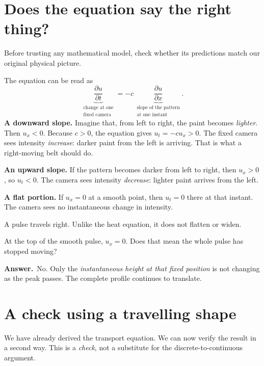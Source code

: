 \documentclass[11pt,a4paper]{article}
\newcommand{\secstart}[1]{\Needspace{7\baselineskip}\section{#1}}
\newcommand{\answer}{\par\smallskip\textbf{Answer.}~}
\newcommand{\captionline}[1]{\begin{center}\small\color{muted}#1\end{center}}
\begin{document}
\clearpage
\secstart{Does the equation say the right thing?}
Before trusting any mathematical model, check whether its predictions match our original physical picture.

The equation can be read as
\[
\underbrace{\frac{\partial u}{\partial t}}_{\substack{\text{change at one}\\\text{fixed camera}}}
=-c\,\underbrace{\frac{\partial u}{\partial x}}_{\substack{\text{slope of the pattern}\\\text{at one instant}}}.
\]
\textbf{A downward slope.} Imagine that, from left to right, the paint becomes \emph{lighter}. Then $u_x<0$. Because $c>0$, the equation gives $u_t=-cu_x>0$. The fixed camera sees intensity \emph{increase}: darker paint from the left is arriving. That is what a right-moving belt should do.

\textbf{An upward slope.} If the pattern becomes darker from left to right, then $u_x>0$, so $u_t<0$. The camera sees intensity \emph{decrease}: lighter paint arrives from the left.

\textbf{A flat portion.} If $u_x=0$ at a smooth point, then $u_t=0$ there at that instant. The camera sees no instantaneous change in intensity.

\begin{center}
\end{center}
\captionline{A pulse travels right. Unlike the heat equation, it does not flatten or widen.}

\begin{thinkbox}
At the top of the smooth pulse, $u_x=0$. Does that mean the whole pulse has stopped moving?
\answer No. Only the \emph{instantaneous height at that fixed position} is not changing as the peak passes. The complete profile continues to translate.
\end{thinkbox}

\clearpage
\secstart{A check using a travelling shape}
We have already derived the transport equation. We can now verify the result in a second way. This is a \emph{check}, not a substitute for the discrete-to-continuous argument.
\end{document}
